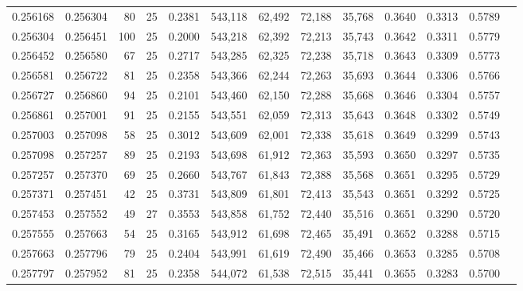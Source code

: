 \begin{tabular}{rrrrrrrrrrrrr}
0.256168 & 0.256304 &    80 &  25 &                                     0.2381 & 543,118 &  62,492 &  72,188 &  35,768 & 0.3640 & 0.3313 & 0.5789 \\
0.256304 & 0.256451 &   100 &  25 &                                     0.2000 & 543,218 &  62,392 &  72,213 &  35,743 & 0.3642 & 0.3311 & 0.5779 \\
0.256452 & 0.256580 &    67 &  25 &                                     0.2717 & 543,285 &  62,325 &  72,238 &  35,718 & 0.3643 & 0.3309 & 0.5773 \\
0.256581 & 0.256722 &    81 &  25 &                                     0.2358 & 543,366 &  62,244 &  72,263 &  35,693 & 0.3644 & 0.3306 & 0.5766 \\
0.256727 & 0.256860 &    94 &  25 &                                     0.2101 & 543,460 &  62,150 &  72,288 &  35,668 & 0.3646 & 0.3304 & 0.5757 \\
0.256861 & 0.257001 &    91 &  25 &                                     0.2155 & 543,551 &  62,059 &  72,313 &  35,643 & 0.3648 & 0.3302 & 0.5749 \\
0.257003 & 0.257098 &    58 &  25 &                                     0.3012 & 543,609 &  62,001 &  72,338 &  35,618 & 0.3649 & 0.3299 & 0.5743 \\
0.257098 & 0.257257 &    89 &  25 &                                     0.2193 & 543,698 &  61,912 &  72,363 &  35,593 & 0.3650 & 0.3297 & 0.5735 \\
0.257257 & 0.257370 &    69 &  25 &                                     0.2660 & 543,767 &  61,843 &  72,388 &  35,568 & 0.3651 & 0.3295 & 0.5729 \\
0.257371 & 0.257451 &    42 &  25 &                                     0.3731 & 543,809 &  61,801 &  72,413 &  35,543 & 0.3651 & 0.3292 & 0.5725 \\
0.257453 & 0.257552 &    49 &  27 &                                     0.3553 & 543,858 &  61,752 &  72,440 &  35,516 & 0.3651 & 0.3290 & 0.5720 \\
0.257555 & 0.257663 &    54 &  25 &                                     0.3165 & 543,912 &  61,698 &  72,465 &  35,491 & 0.3652 & 0.3288 & 0.5715 \\
0.257663 & 0.257796 &    79 &  25 &                                     0.2404 & 543,991 &  61,619 &  72,490 &  35,466 & 0.3653 & 0.3285 & 0.5708 \\
0.257797 & 0.257952 &    81 &  25 &                                     0.2358 & 544,072 &  61,538 &  72,515 &  35,441 & 0.3655 & 0.3283 & 0.5700 \\

\end{tabular}
